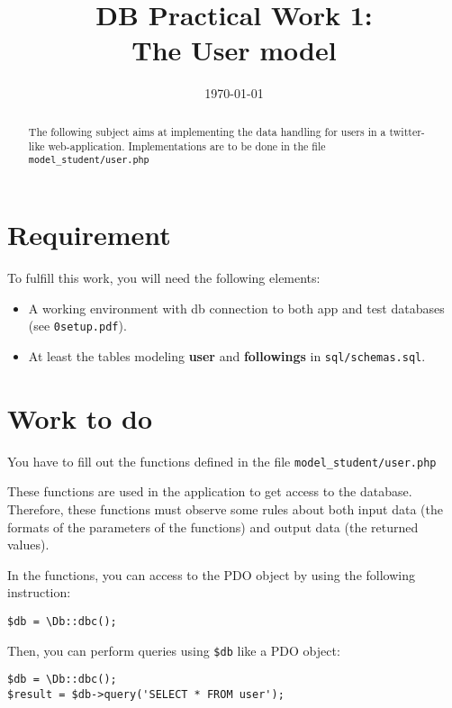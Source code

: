 \documentclass[twoside,a4paper,12pt]{article}
\title{DB Practical Work 1:\\The User model}
\date{\today}
\begin{document}
\maketitle

\begin{abstract}
  The following subject aims at implementing the data handling for users in a twitter-like web-application. Implementations are to be done in the file \texttt{model\_student/user.php}
\end{abstract}

\tableofcontents

\clearpage

\section{Requirement}
To fulfill this work, you will need the following elements:

\begin{itemize}
\item A working environment with db connection to both app and test databases (see \texttt{0setup.pdf}).
\item At least the tables modeling \textbf{user} and \textbf{followings} in \texttt{sql/schemas.sql}.
\end{itemize}

\section{Work to do}
You have to fill out the functions defined in the file \texttt{model\_student/user.php}

These functions are used in the application to get access to the database. Therefore, these functions must observe some rules about both input data (the formats of the parameters of the functions) and output data (the returned values).

In the functions, you can access to the PDO object by using the following instruction:

\begin{lstlisting}
$db = \Db::dbc();
\end{lstlisting}

Then, you can perform queries using \texttt{\$db} like a PDO object:
\begin{lstlisting}
$db = \Db::dbc();
$result = $db->query('SELECT * FROM user');
\end{lstlisting}
\end{document}
